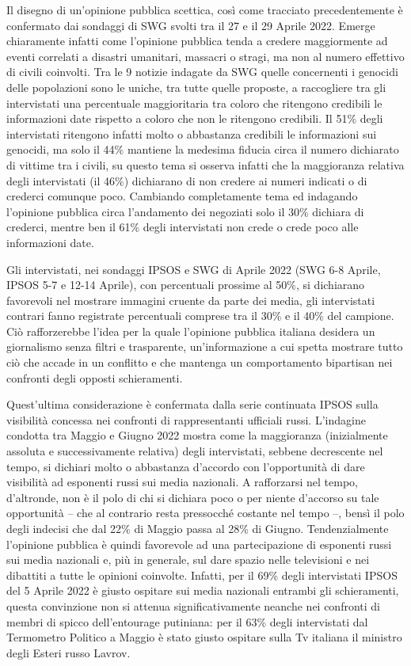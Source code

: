 \documentclass[
  openany]{book}
\begin{document}
Il disegno di un'opinione pubblica scettica, così come tracciato precedentemente è confermato dai sondaggi di SWG svolti tra il 27 e il 29 Aprile 2022. Emerge chiaramente infatti come l'opinione pubblica tenda a credere maggiormente ad eventi correlati a disastri umanitari, massacri o stragi, ma non al numero effettivo di civili coinvolti. Tra le 9 notizie indagate da SWG quelle concernenti i genocidi delle popolazioni sono le uniche, tra tutte quelle proposte, a raccogliere tra gli intervistati una percentuale maggioritaria tra coloro che ritengono credibili le informazioni date rispetto a coloro che non le ritengono credibili. Il 51\% degli intervistati ritengono infatti molto o abbastanza credibili le informazioni sui genocidi, ma solo il 44\% mantiene la medesima fiducia circa il numero dichiarato di vittime tra i civili, su questo tema si osserva infatti che la maggioranza relativa degli intervistati (il 46\%) dichiarano di non credere ai numeri indicati o di crederci comunque poco. Cambiando completamente tema ed indagando l'opinione pubblica circa l'andamento dei negoziati solo il 30\% dichiara di crederci, mentre ben il 61\% degli intervistati non crede o crede poco alle informazioni date.

Gli intervistati, nei sondaggi IPSOS e SWG di Aprile 2022 (SWG 6-8 Aprile, IPSOS 5-7 e 12-14 Aprile), con percentuali prossime al 50\%, si dichiarano favorevoli nel mostrare immagini cruente da parte dei media, gli intervistati contrari fanno registrate percentuali comprese tra il 30\% e il 40\% del campione. Ciò rafforzerebbe l'idea per la quale l'opinione pubblica italiana desidera un giornalismo senza filtri e trasparente, un'informazione a cui spetta mostrare tutto ciò che accade in un conflitto e che mantenga un comportamento bipartisan nei confronti degli opposti schieramenti.

Quest'ultima considerazione è confermata dalla serie continuata IPSOS sulla visibilità concessa nei confronti di rappresentanti ufficiali russi. L'indagine condotta tra Maggio e Giugno 2022 mostra come la maggioranza (inizialmente assoluta e successivamente relativa) degli intervistati, sebbene decrescente nel tempo, si dichiari molto o abbastanza d'accordo con l'opportunità di dare visibilità ad esponenti russi sui media nazionali. A rafforzarsi nel tempo, d'altronde, non è il polo di chi si dichiara poco o per niente d'accorso su tale opportunità -- che al contrario resta pressocché costante nel tempo --, bensì il polo degli indecisi che dal 22\% di Maggio passa al 28\% di Giugno.
Tendenzialmente l'opinione pubblica è quindi favorevole ad una partecipazione di esponenti russi sui media nazionali e, più in generale, sul dare spazio nelle televisioni e nei dibattiti a tutte le opinioni coinvolte. Infatti, per il 69\% degli intervistati IPSOS del 5 Aprile 2022 è giusto ospitare sui media nazionali entrambi gli schieramenti, questa convinzione non si attenua significativamente neanche nei confronti di membri di spicco dell'entourage putiniana: per il 63\% degli intervistati dal Termometro Politico a Maggio è stato giusto ospitare sulla Tv italiana il ministro degli Esteri russo Lavrov.
\end{document}
